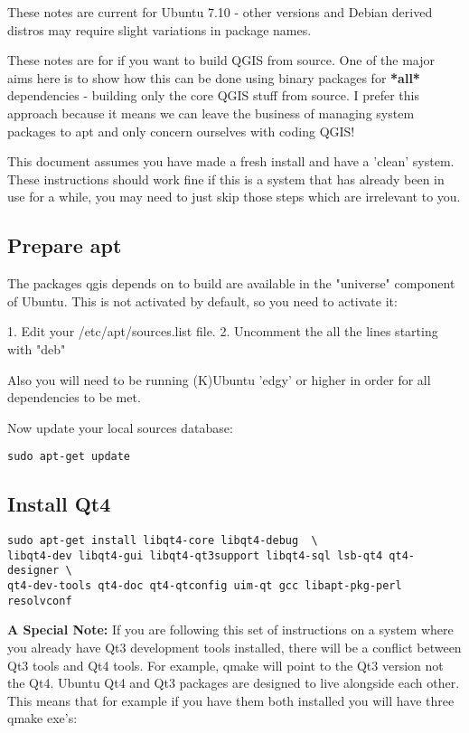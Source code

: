 These notes are current for Ubuntu 7.10 - other versions and Debian derived 
distros may require slight variations in package names.

These notes are for if you want to build QGIS from source. One of the major
aims here is to show how this can be done using binary packages for \textbf{*all*}
dependencies - building only the core QGIS stuff from source. I prefer this
approach because it means we can leave the business of managing system packages
to apt and only concern ourselves with coding QGIS! 

This document assumes you have made a fresh install and have a 'clean' system.
These instructions should work fine if this is a system that has already been
in use for a while, you may need to just skip those steps which are irrelevant
to you.

\subsection{Prepare apt}
The packages qgis depends on to build are available in the "universe" component
of Ubuntu. This is not activated by default, so you need to activate it:

1. Edit your /etc/apt/sources.list file.  
2. Uncomment the all the lines starting with "deb"

Also you will need to be running (K)Ubuntu 'edgy' or higher in order for 
all dependencies to be met.

Now update your local sources database:

\begin{verbatim}
sudo apt-get update 
\end{verbatim}

\subsection{Install Qt4}
\begin{verbatim}
sudo apt-get install libqt4-core libqt4-debug  \
libqt4-dev libqt4-gui libqt4-qt3support libqt4-sql lsb-qt4 qt4-designer \
qt4-dev-tools qt4-doc qt4-qtconfig uim-qt gcc libapt-pkg-perl resolvconf
\end{verbatim}

\textbf{A Special Note:} If you are following this set of instructions on
a system where you already have Qt3 development tools installed, there will
be a conflict between Qt3 tools and Qt4 tools. For example, qmake will
point to the Qt3 version not the Qt4. Ubuntu Qt4 and Qt3 packages are
designed to live alongside each other. This means that for example if you
have them both installed you will have three qmake exe's:

